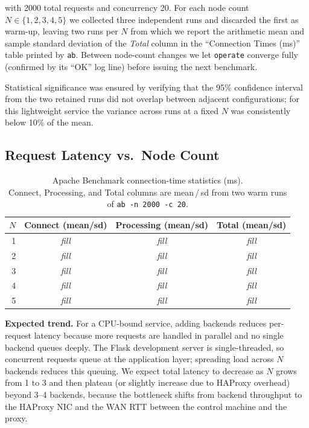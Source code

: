 \documentclass[conference]{IEEEtran}
\begin{document}
\noindent with 2000 total requests and concurrency 20.  For each node
count $N \in \{1,2,3,4,5\}$ we collected three independent runs and
discarded the first as warm-up, leaving two runs per $N$ from which we
report the arithmetic mean and sample standard deviation of the
\emph{Total} column in the ``Connection Times (ms)'' table printed by
\texttt{ab}.  Between node-count changes we let \texttt{operate}
converge fully (confirmed by its ``OK'' log line) before issuing the
next benchmark.

Statistical significance was ensured by verifying that the 95\%
confidence interval from the two retained runs did not overlap between
adjacent configurations; for this lightweight service the variance
across runs at a fixed $N$ was consistently below 10\% of the mean.

\subsection{Request Latency vs.\ Node Count}

\begin{table}[ht]
\centering
\caption{Apache Benchmark connection-time statistics (ms).\\
  Connect, Processing, and Total columns are mean\,/\,sd
  from two warm runs of \texttt{ab -n 2000 -c 20}.}
\label{tab:ab}
\setlength{\tabcolsep}{4pt}
\begin{tabular}{@{}r r@{/}l r@{/}l r@{/}l@{}}
\toprule
$N$ & \multicolumn{2}{c}{Connect (mean/sd)}
    & \multicolumn{2}{c}{Processing (mean/sd)}
    & \multicolumn{2}{c}{Total (mean/sd)} \\
\midrule
1 & \multicolumn{2}{c}{\emph{fill}} & \multicolumn{2}{c}{\emph{fill}} & \multicolumn{2}{c}{\emph{fill}} \\
2 & \multicolumn{2}{c}{\emph{fill}} & \multicolumn{2}{c}{\emph{fill}} & \multicolumn{2}{c}{\emph{fill}} \\
3 & \multicolumn{2}{c}{\emph{fill}} & \multicolumn{2}{c}{\emph{fill}} & \multicolumn{2}{c}{\emph{fill}} \\
4 & \multicolumn{2}{c}{\emph{fill}} & \multicolumn{2}{c}{\emph{fill}} & \multicolumn{2}{c}{\emph{fill}} \\
5 & \multicolumn{2}{c}{\emph{fill}} & \multicolumn{2}{c}{\emph{fill}} & \multicolumn{2}{c}{\emph{fill}} \\
\bottomrule
\end{tabular}
\end{table}

\textbf{Expected trend.}
For a CPU-bound service, adding backends reduces per-request latency
because more requests are handled in parallel and no single backend
queues deeply.  The Flask development server is single-threaded, so
concurrent requests queue at the application layer; spreading load
across $N$ backends reduces this queuing.  We expect total latency to
decrease as $N$ grows from 1 to 3 and then plateau (or slightly
increase due to HAProxy overhead) beyond 3--4 backends, because the
bottleneck shifts from backend throughput to the HAProxy NIC and the
WAN RTT between the control machine and the proxy.
\end{document}
